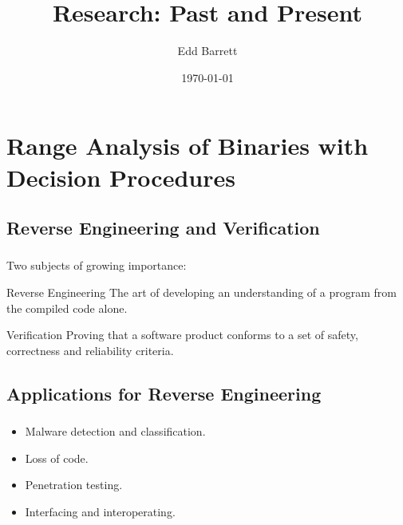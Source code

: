 \documentclass[compress]{beamer}
\title{Research: Past and Present}
\author{Edd Barrett}
\date{\today}
\institute{%
	Software Development Team\\
	King's College London, England
}
\begin{document}
\begin{frame}
  \titlepage
\end{frame}

\section{Range Analysis of Binaries with Decision Procedures}

\begin{frame}
  \sectionpage
\end{frame}

\subsection{Reverse Engineering and Verification}

\begin{frame}[fragile]
	\frametitle{\insertsubsection}

	Two subjects of growing importance:
	\vfill
	\begin{block}{Reverse Engineering}
                The art of developing an understanding of a program from
                the compiled code alone.
	\end{block}
	\vfill
	\begin{block}{Verification}
                Proving that a software product conforms to a set of
                safety, correctness and reliability criteria.
	\end{block}

\end{frame}


\subsection{Applications for Reverse Engineering}
\begin{frame}[fragile]
	\frametitle{\insertsubsection}

	\begin{itemize}
		\vfill
	\item Malware detection and classification.
		\vfill
	\item Loss of code.
		\vfill
	\item Penetration testing.
		\vfill
	\item Interfacing and interoperating.
		\vfill
	\end{itemize}

\end{frame}
\end{document}
